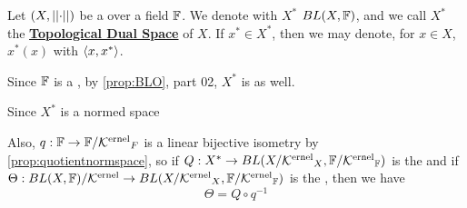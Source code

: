\label{def:topologicaldualspace}
\newcommand{\SemiTopDualSpace}[0]{\textbf{\hyperref[def:topologicaldualspace]{Topological Dual Space}}\xspace}
\begin{df}
    Let $(X,\left|\left| \cdot \right|\right|)$ be a 
    \SeminormedSpace
    over a field $\mathbb{F}$. 
    We denote with $X^*$ 
    \NormedSpace $BL(X,\mathbb{F})$, 
    and we call $X^*$ the
    \SemiTopDualSpace of $X$. 
    If $x^* \in X^*$, then we may denote, 
    for $x \in X$, 
    $x^*(x)$
    with 
    $\left\langle x,x^* \right\rangle$. 


    
    Since $\mathbb{F}$ is a \NormedSpace, 
    by \ref{prop:BLO}, 
    part 02, $X^*$ is as well. 

    Since $X^*$ is a normed space 

    Also, $q:\mathbb{F} \to \mathbb{F}/\textbf{\ensuremath{\mathcal{K}\rm^{ernel}}}_F$ 
    is a linear bijective isometry by 
    \ref{prop:quotientnormspace}, so
    if $Q:X^* \to BL(X/\textbf{\ensuremath{\mathcal{K}\rm^{ernel}}}_X, \mathbb{F}/\textbf{\ensuremath{\mathcal{K}\rm^{ernel}}}_{\mathbb{F}})$ is the \OperatorQuotientMap
    and if $\Theta:BL(X,\mathbb{F})/\textbf{\ensuremath{\mathcal{K}\rm^{ernel}}} \to BL(X/\textbf{\ensuremath{\mathcal{K}\rm^{ernel}}}_X, \mathbb{F}/\textbf{\ensuremath{\mathcal{K}\rm^{ernel}}}_\mathbb{F})$ 
    is the \CanonicalIso, then we have 
    \begin{equation}
    \Theta=Q \circ q^{-1}
    \end{equation}


\end{df}
